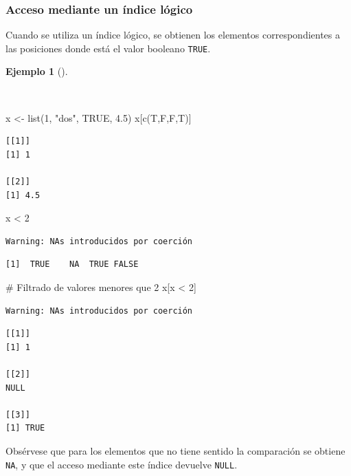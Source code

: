 \documentclass[
  a4paper,
]{scrreport}
\newenvironment{Shaded}{\begin{snugshade}}{\end{snugshade}}
\newcommand{\CommentTok}[1]{\textcolor[rgb]{0.37,0.37,0.37}{#1}}
\newcommand{\ConstantTok}[1]{\textcolor[rgb]{0.56,0.35,0.01}{#1}}
\newcommand{\DecValTok}[1]{\textcolor[rgb]{0.68,0.00,0.00}{#1}}
\newcommand{\FloatTok}[1]{\textcolor[rgb]{0.68,0.00,0.00}{#1}}
\newcommand{\FunctionTok}[1]{\textcolor[rgb]{0.28,0.35,0.67}{#1}}
\newcommand{\NormalTok}[1]{\textcolor[rgb]{0.00,0.23,0.31}{#1}}
\newcommand{\OtherTok}[1]{\textcolor[rgb]{0.00,0.23,0.31}{#1}}
\newcommand{\SpecialCharTok}[1]{\textcolor[rgb]{0.37,0.37,0.37}{#1}}
\newcommand{\StringTok}[1]{\textcolor[rgb]{0.13,0.47,0.30}{#1}}
\theoremstyle{definition}
\theoremstyle{definition}
\newtheorem{example}{Ejemplo}[chapter]
\theoremstyle{remark}
\begin{document}
\subsubsection{Acceso mediante un índice
lógico}\label{acceso-mediante-un-uxedndice-luxf3gico-1}

Cuando se utiliza un índice lógico, se obtienen los elementos
correspondientes a las posiciones donde está el valor booleano
\texttt{TRUE}.

\begin{example}[]\protect\hypertarget{exm-acceso-listas-logico}{}\label{exm-acceso-listas-logico}

~

\begin{Shaded}
\begin{Highlighting}[]
\NormalTok{x }\OtherTok{\textless{}{-}} \FunctionTok{list}\NormalTok{(}\DecValTok{1}\NormalTok{, }\StringTok{"dos"}\NormalTok{, }\ConstantTok{TRUE}\NormalTok{, }\FloatTok{4.5}\NormalTok{)}
\NormalTok{x[}\FunctionTok{c}\NormalTok{(T,F,F,T)]}
\end{Highlighting}
\end{Shaded}

\begin{verbatim}
[[1]]
[1] 1

[[2]]
[1] 4.5
\end{verbatim}

\begin{Shaded}
\begin{Highlighting}[]
\NormalTok{x }\SpecialCharTok{\textless{}} \DecValTok{2}
\end{Highlighting}
\end{Shaded}

\begin{verbatim}
Warning: NAs introducidos por coerción
\end{verbatim}

\begin{verbatim}
[1]  TRUE    NA  TRUE FALSE
\end{verbatim}

\begin{Shaded}
\begin{Highlighting}[]
\CommentTok{\# Filtrado de valores menores que 2}
\NormalTok{x[x }\SpecialCharTok{\textless{}} \DecValTok{2}\NormalTok{]}
\end{Highlighting}
\end{Shaded}

\begin{verbatim}
Warning: NAs introducidos por coerción
\end{verbatim}

\begin{verbatim}
[[1]]
[1] 1

[[2]]
NULL

[[3]]
[1] TRUE
\end{verbatim}

Obsérvese que para los elementos que no tiene sentido la comparación se
obtiene \texttt{NA}, y que el acceso mediante este índice devuelve
\texttt{NULL}.

\end{example}
\end{document}

